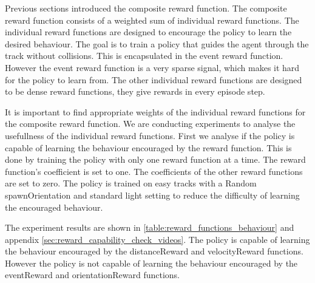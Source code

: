 Previous sections introduced the composite reward function. The composite reward function consists of a weighted sum of individual reward functions. The individual reward functions are designed to encourage the policy to learn the desired behaviour. The goal is to train a policy that guides the agent through the track without collisions. This is encapsulated in the event reward function. However the event reward function is a very sparse signal, which makes it hard for the policy to learn from. The other individual reward functions are designed to be dense reward functions, they give rewards in every episode step.


It is important to find appropriate weights of the individual reward functions for the composite reward function. We are conducting experiments to analyse the usefullness of the individual reward functions. First we analyse if the policy is capable of learning the behaviour encouraged by the reward function.
This is done by training the policy with only one reward function at a time. The reward function's coefficient is set to one. The coefficients of the other reward functions are set to zero. The policy is trained on easy tracks with a Random spawnOrientation and standard light setting to reduce the difficulty of learning the encouraged behaviour.


The experiment results are shown in \ref{table:reward_functions_behaviour} and appendix \ref{sec:reward_capability_check_videos}. The policy is capable of learning the behaviour encouraged by the distanceReward and velocityReward functions. However the policy is not capable of learning the behaviour encouraged by the eventReward and orientationReward functions.


